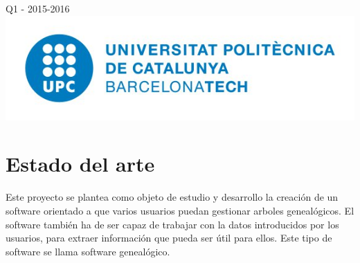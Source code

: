 \documentclass[12pt]{article} %
\begin{document}
\begin{titlepage}

{\large Q1 - 2015-2016}\\[2cm] %


\includegraphics[scale=0.7]{add/logo_upc.png}\\[1cm] %
 

\vfill %

\end{titlepage}


\tableofcontents %

\newpage %


\section{Estado del arte}
Este proyecto se plantea como objeto de estudio y desarrollo la creación de un software orientado a que varios usuarios puedan gestionar arboles genealógicos. El software también ha de ser capaz de trabajar con la datos introducidos por los usuarios, para extraer información que pueda ser útil para ellos. Este tipo de software se llama software genealógico.
\end{document}
